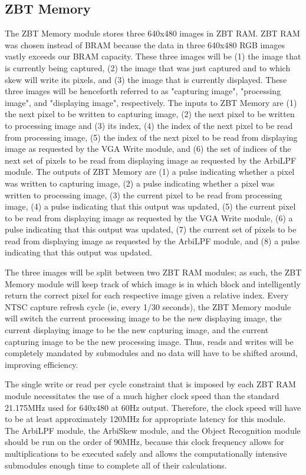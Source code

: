 \documentclass{article}
\begin{document}
\subsection{ZBT Memory}
The ZBT Memory module stores three 640x480 images in ZBT RAM. ZBT RAM was chosen instead of BRAM because the data in three 640x480 RGB images vastly exceeds our BRAM capacity. These three images will be (1) the image that is currently being captured, (2) the image that was just captured and to which skew will write its pixels, and (3) the image that is currently displayed. These three images will be henceforth referred to as "capturing image", "processing image", and "displaying image", respectively. The inputs to ZBT Memory are (1) the next pixel to be written to capturing image, (2) the next pixel to be written to processing image and (3) its index, (4) the index of the next pixel to be read from processing image, (5) the index of the next pixel to be read from displaying image as requested by the VGA Write module, and (6) the set of indices of the next set of pixels to be read from displaying image as requested by the ArbiLPF module. The outputs of ZBT Memory are (1) a pulse indicating whether a pixel was written to capturing image, (2) a pulse indicating whether a pixel was written to processing image, (3) the current pixel to be read from processing image, (4) a pulse indicating that this output was updated, (5) the current pixel to be read from displaying image as requested by the VGA Write module, (6) a pulse indicating that this output was updated, (7) the current set of pixels to be read from displaying image as requested by the ArbiLPF module, and (8) a pulse indicating that this output was updated.

The three images will be split between two ZBT RAM modules; as such, the ZBT Memory module will keep track of which image is in which block and intelligently return the correct pixel for each respective image given a relative index. Every NTSC capture refresh cycle (ie, every 1/30 seconds), the ZBT Memory module will switch the current processing image to be the new displaying image, the current displaying image to be the new capturing image, and the current capturing image to be the new processing image. Thus, reads and writes will be completely mandated by submodules and no data will have to be shifted around, improving efficiency.

The single write or read per cycle constraint that is imposed by each ZBT RAM module necessitates the use of a much higher clock speed than the standard 21.175MHz used for 640x480 at 60Hz output. Therefore, the clock speed will have to be at least approximately 120MHz for appropriate latency for this module. The ArbiLPF module, the ArbiSkew module, and the Object Recognition module should be run on the order of 90MHz, because this clock frequency allows for multiplications to be executed safely and allows the computationally intensive submodules enough time to complete all of their calculations.
\end{document}
